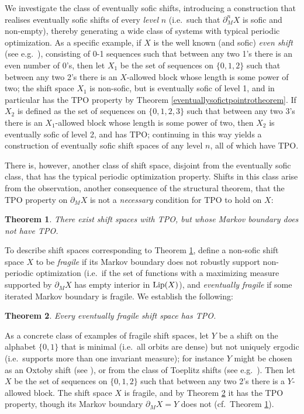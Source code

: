 \documentclass[reqno,11pt]{amsart}
\newtheorem{thm}{Theorem}[section]
\theoremstyle{definition}
\theoremstyle{remark}
\theoremstyle{remark}
\def\lip{{\rm Lip}}
\numberwithin{equation}{section}
\begin{document}
We investigate the class of eventually sofic shifts, introducing a construction that
realises eventually sofic shifts of every \emph{level} $n$
(i.e.~such that $\partial^n_M X$ is sofic and non-empty), thereby generating a wide class of 
systems with typical periodic optimization.
As a specific example, if $X$ is the well known (and sofic) \emph{even shift} (see e.g.~\cite[\S 1.2]{LM95}),
consisting of 0-1 sequences
such that between any two 1's there is an even number of 0's,
then let $X_1$ be the set of sequences on $\{0,1,2\}$ such that between any two 2's there is an $X$-allowed
block whose length is some power of two; the shift space $X_1$ is non-sofic, but is eventually sofic of level 1,
and in particular has the TPO property by Theorem \ref{eventuallysofictpointrotheorem}.
If $X_2$ is defined as
the set of sequences on $\{0,1,2,3\}$ such that between any two 3's there is an $X_1$-allowed
block whose length is some power of two, then $X_2$ is eventually sofic of level 2,
and has TPO; continuing in this way yields a construction of eventually sofic shift spaces of any level $n$,
all of which have TPO.

There is, however, another class of shift space, disjoint from the eventually sofic class,
that has the typical periodic optimization property.
Shifts in this class arise from the observation,
another consequence of the structural theorem,
that the TPO property on $\partial_M X$ is not a \emph{necessary} condition for TPO
to hold  on $X$:

\begin{thm}\label{X_tpo_does_not_imply_partialX_tpo}
There exist 
shift spaces with TPO, but whose Markov boundary does not have TPO.
\end{thm}

To describe shift spaces corresponding to Theorem \ref{X_tpo_does_not_imply_partialX_tpo},
define a non-sofic shift space $X$ to be \emph{fragile} if its Markov boundary does not robustly support non-periodic optimization
(i.e.~if the set of functions with a maximizing measure supported by $\partial_M X$ has empty interior in $\lip(X)$), and \emph{eventually fragile} if some iterated Markov boundary is fragile.
We establish the following:

\begin{thm}\label{eventually_fragile_tpo_intro}
Every eventually fragile shift space has TPO.
\end{thm}

As a concrete class of examples of fragile shift spaces, let $Y$ be a shift on the alphabet $\{0,1\}$ that is minimal
(i.e.~all orbits are dense) but not uniquely ergodic (i.e.~supports more than one invariant measure);
for instance $Y$ might be chosen as an Oxtoby shift (see \cite{oxtoby}), or from the class of Toeplitz shifts
(see e.g.~\cite{downarowicz, jacobskeane, markleypaul, williams}). Then let $X$ be the set of sequences on $\{0,1,2\}$
such that between any two 2's there is a $Y$-allowed block.
The shift space $X$ is fragile, and by Theorem \ref{eventually_fragile_tpo_intro} it has the TPO property,
though its Markov boundary $\partial_M X=Y$ does not (cf.~Theorem \ref{X_tpo_does_not_imply_partialX_tpo}).
\end{document}
